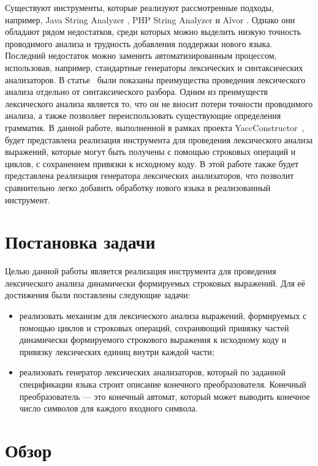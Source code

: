 Существуют инструменты, которые реализуют рассмотренные подходы, например, Java String Analyzer \cite{JSA1}, PHP String Analyzer \cite{PHPSA} и Alvor \cite{Alvor1}. Однако они обладают рядом недостатков, среди которых можно выделить низкую точность проводимого анализа и трудность добавления поддержки нового языка. Последний недостаток можно заменить автоматизированным процессом, использовав, например, стандартные генераторы лексических и синтаксических анализаторов. В статье~\cite{LexerAdv} были показаны преимущества проведения лексического анализа отдельно от синтаксического разбора. Одним из преимуществ лексического анализа является то, что он не вносит потери точности проводимого анализа, а также позволяет переиспользовать существующие определения грамматик. В данной работе, выполненной в рамках проекта YaccConstructor~\cite{YC_article}, будет представлена реализация инструмента для проведения лексического анализа выражений, которые могут быть получены с помощью строковых операций и циклов, с сохранением привязки к исходному коду. В этой работе также будет представлена реализация генератора лексических анализаторов, что позволит сравнительно легко добавить обработку нового языка в реализованный инструмент.


\section{Постановка задачи}
Целью данной работы является реализация инструмента для проведения лексического анализа динамически формируемых строковых выражений. Для её достижения были поставлены следующие задачи:

\begin{itemize}
\item реализовать механизм для лексического анализа выражений, формируемых с помощью циклов и строковых операций, сохраняющий привязку частей динамически формируемого строкового выражения к исходному коду и привязку лексических единиц внутри каждой части;
\item реализовать генератор лексических анализаторов, который по заданной спецификации языка строит описание конечного преобразователя. Конечный преобразователь --- это конечный автомат, который может выводить конечное число символов для каждого входного символа.
\end{itemize}


\section{Обзор}

